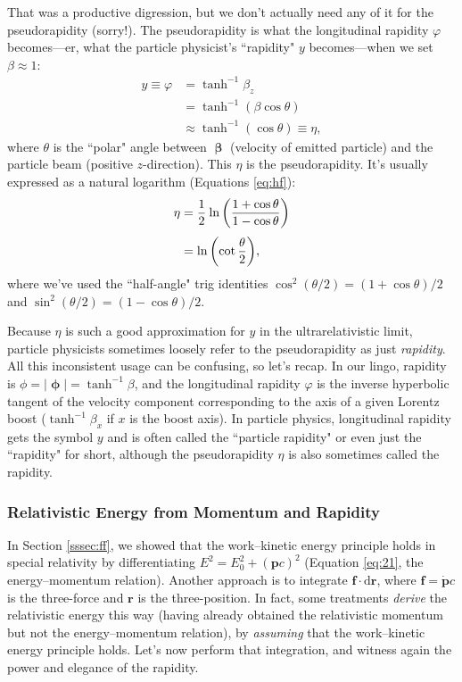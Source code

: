 \documentclass[12pt]{article}
\renewcommand{\vv}[1]{\mathbf{#1}}
\newcommand{\dd}[1]{\mathrm{d}#1}
\newcommand{\vvbeta}{\bm{\upbeta}}
\begin{document}
That was a productive digression, but we don't actually need any of it for the pseudorapidity (sorry!). The pseudorapidity is what the longitudinal rapidity $\varphi$ becomes---er, what the particle physicist's ``rapidity" $y$ becomes---when we set $\beta \approx 1$:
\begin{equation*}
\begin{aligned}
y \equiv \varphi &= \tanh^{-1} \beta_z \\
&= \tanh^{-1} ( \beta \cos{\theta} ) \\
& \approx  \tanh^{-1} ( \cos{\theta} ) \equiv \eta ,
\end{aligned}
\end{equation*}
where $\theta$ is the ``polar" angle between $\vvbeta$ (velocity of emitted particle) and the particle beam (positive $z$-direction). This $\eta$ is the pseudorapidity. It's usually expressed as a natural logarithm (Equations \ref{eq:hf}):
\begin{equation*}
\begin{split}
\eta &= \dfrac{1}{2} \mkern1mu \ln{ \left( \dfrac{1 + \cos{\theta}}{1 - \cos{\theta}} \right) } \\[3pt]
&= \ln{ \left( \cot {\dfrac{\theta}{2}} \right) },
\end{split}
\end{equation*}
where we've used the ``half-angle" trig identities $\cos^2{(\theta / 2)} = (1 + \cos{\theta})/2$ and $\sin^2{(\theta / 2)} = (1 - \cos{\theta})/2$.

Because $\eta$ is such a good approximation for $y$ in the ultrarelativistic limit, particle physicists sometimes loosely refer to the pseudorapidity as just \emph{rapidity}. All this inconsistent usage can be confusing, so let's recap. In our lingo, rapidity is $\phi = \vert \bm{\upphi} \vert = \tanh^{-1}{\beta}$, and the longitudinal rapidity $\varphi$ is the inverse hyperbolic tangent of the velocity component corresponding to the axis of a given Lorentz boost ($\tanh^{-1}{\beta_x}$ if $x$ is the boost axis). In particle physics, longitudinal rapidity gets the symbol $y$ and is often called the ``particle rapidity" or even just the ``rapidity" for short, although the pseudorapidity $\eta$ is also sometimes called the rapidity.

\subsubsection{Relativistic Energy from Momentum and Rapidity}

In Section \ref{sssec:ff}, we showed that the work--kinetic energy principle holds in special relativity by differentiating $E^2 = E_0^2 + (\vv p c)^2$ (Equation \ref{eq:21}, the energy--momentum relation). Another approach is to integrate $\vv f \cdot \dd \vv r$, where $\vv f = \dot{\vv p}c$ is the three-force and $\vv r$ is the three-position. In fact, some treatments \emph{derive} the relativistic energy this way (having already obtained the relativistic momentum but not the energy--momentum relation), by \emph{assuming} that the work--kinetic energy principle holds. Let's now perform that integration, and witness again the power and elegance of the rapidity.
\end{document}
